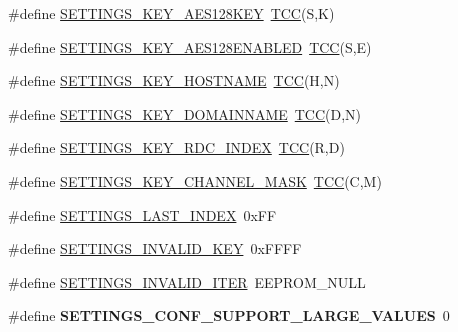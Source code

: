 \begin{DoxyCompactItemize}
\item 
\#define \hyperlink{group__settings__lib_gaf21df4e4821b6c46ab1827709e6ab3ba}{S\+E\+T\+T\+I\+N\+G\+S\+\_\+\+K\+E\+Y\+\_\+\+A\+E\+S128\+K\+E\+Y}~\hyperlink{group__settings__lib_ga407b8baa58a9c300c51b102b71c1f75c}{T\+C\+C}(\textquotesingle{}S\textquotesingle{},\textquotesingle{}K\textquotesingle{})
\item 
\#define \hyperlink{group__settings__lib_gaa59c4b915df4211a5b4772cfd064a02f}{S\+E\+T\+T\+I\+N\+G\+S\+\_\+\+K\+E\+Y\+\_\+\+A\+E\+S128\+E\+N\+A\+B\+L\+E\+D}~\hyperlink{group__settings__lib_ga407b8baa58a9c300c51b102b71c1f75c}{T\+C\+C}(\textquotesingle{}S\textquotesingle{},\textquotesingle{}E\textquotesingle{})
\item 
\#define \hyperlink{group__settings__lib_ga4aef84d3f6c558a1af998e466a42a9f4}{S\+E\+T\+T\+I\+N\+G\+S\+\_\+\+K\+E\+Y\+\_\+\+H\+O\+S\+T\+N\+A\+M\+E}~\hyperlink{group__settings__lib_ga407b8baa58a9c300c51b102b71c1f75c}{T\+C\+C}(\textquotesingle{}H\textquotesingle{},\textquotesingle{}N\textquotesingle{})
\item 
\#define \hyperlink{group__settings__lib_ga9d8929327ef3aa77972a387251ccdcc5}{S\+E\+T\+T\+I\+N\+G\+S\+\_\+\+K\+E\+Y\+\_\+\+D\+O\+M\+A\+I\+N\+N\+A\+M\+E}~\hyperlink{group__settings__lib_ga407b8baa58a9c300c51b102b71c1f75c}{T\+C\+C}(\textquotesingle{}D\textquotesingle{},\textquotesingle{}N\textquotesingle{})
\item 
\#define \hyperlink{group__settings__lib_ga86031e7d26d3a50e646e6e5aec152472}{S\+E\+T\+T\+I\+N\+G\+S\+\_\+\+K\+E\+Y\+\_\+\+R\+D\+C\+\_\+\+I\+N\+D\+E\+X}~\hyperlink{group__settings__lib_ga407b8baa58a9c300c51b102b71c1f75c}{T\+C\+C}(\textquotesingle{}R\textquotesingle{},\textquotesingle{}D\textquotesingle{})
\item 
\#define \hyperlink{group__settings__lib_ga1b3663a78693d45475737c70a295e519}{S\+E\+T\+T\+I\+N\+G\+S\+\_\+\+K\+E\+Y\+\_\+\+C\+H\+A\+N\+N\+E\+L\+\_\+\+M\+A\+S\+K}~\hyperlink{group__settings__lib_ga407b8baa58a9c300c51b102b71c1f75c}{T\+C\+C}(\textquotesingle{}C\textquotesingle{},\textquotesingle{}M\textquotesingle{})
\item 
\#define \hyperlink{group__settings__lib_gaccd70bd1f6a3ccce8fb515339452f5cf}{S\+E\+T\+T\+I\+N\+G\+S\+\_\+\+L\+A\+S\+T\+\_\+\+I\+N\+D\+E\+X}~0x\+F\+F
\item 
\#define \hyperlink{group__settings__lib_gae6f2c165b60a67997b96c9b5053a9b93}{S\+E\+T\+T\+I\+N\+G\+S\+\_\+\+I\+N\+V\+A\+L\+I\+D\+\_\+\+K\+E\+Y}~0x\+F\+F\+F\+F
\item 
\#define \hyperlink{group__settings__lib_ga0d47f7bb51bbb0c6a6d32ff9051b5c1d}{S\+E\+T\+T\+I\+N\+G\+S\+\_\+\+I\+N\+V\+A\+L\+I\+D\+\_\+\+I\+T\+E\+R}~E\+E\+P\+R\+O\+M\+\_\+\+N\+U\+L\+L
\item 
\hypertarget{group__settings__lib_gaf14752d92f2bb4490e50b6121a646c3b}{}\#define {\bfseries S\+E\+T\+T\+I\+N\+G\+S\+\_\+\+C\+O\+N\+F\+\_\+\+S\+U\+P\+P\+O\+R\+T\+\_\+\+L\+A\+R\+G\+E\+\_\+\+V\+A\+L\+U\+E\+S}~0\label{group__settings__lib_gaf14752d92f2bb4490e50b6121a646c3b}


\end{DoxyCompactItemize}
